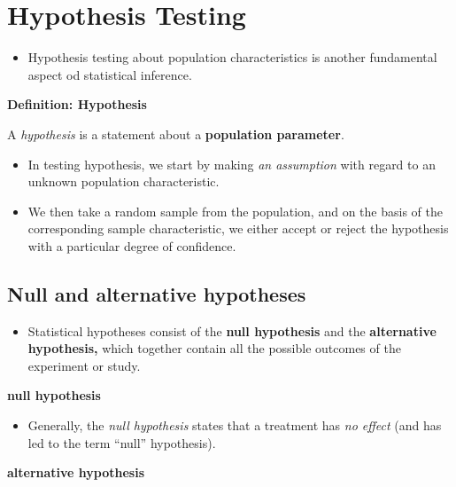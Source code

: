 \documentclass[]{book}
\providecommand{\tightlist}{%
  \setlength{\itemsep}{0pt}\setlength{\parskip}{0pt}}
\begin{document}
\hypertarget{hypothesis-testing}{%
\chapter{Hypothesis Testing}\label{hypothesis-testing}}

\begin{itemize}
\tightlist
\item
  Hypothesis testing about population characteristics is another fundamental aspect od statistical inference.
\end{itemize}

\textbf{Definition: Hypothesis }

A \emph{hypothesis} is a statement about a \textbf{population parameter}.

\begin{itemize}
\tightlist
\item
  In testing hypothesis, we start by making \emph{an assumption} with regard to an unknown population characteristic.
\item
  We then take a random sample from the population, and on the basis of the corresponding sample characteristic, we either accept or reject the hypothesis with a particular degree of confidence.
\end{itemize}

\hypertarget{null-and-alternative-hypotheses}{%
\section{Null and alternative hypotheses}\label{null-and-alternative-hypotheses}}

\begin{itemize}
\tightlist
\item
  Statistical hypotheses consist of the \textbf{null hypothesis} and the \textbf{alternative hypothesis,} which together contain all the possible outcomes of the experiment or study.
\end{itemize}

\textbf{null hypothesis}

\begin{itemize}
\tightlist
\item
  Generally, the \emph{null hypothesis} states that a treatment has \emph{no effect} (and has led to the term ``null'' hypothesis).
\end{itemize}

\textbf{alternative hypothesis}
\end{document}
